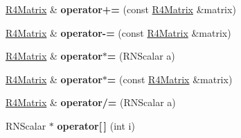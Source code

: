 \begin{DoxyCompactItemize}
\item 
\hyperlink{class_r4_matrix}{R4\+Matrix} \& {\bfseries operator+=} (const \hyperlink{class_r4_matrix}{R4\+Matrix} \&matrix)\hypertarget{class_r4_matrix_a163aa0238951f372d740945263e72efc}{}\label{class_r4_matrix_a163aa0238951f372d740945263e72efc}

\item 
\hyperlink{class_r4_matrix}{R4\+Matrix} \& {\bfseries operator-\/=} (const \hyperlink{class_r4_matrix}{R4\+Matrix} \&matrix)\hypertarget{class_r4_matrix_af39fe3d76d8e47f16345dacb07b72322}{}\label{class_r4_matrix_af39fe3d76d8e47f16345dacb07b72322}

\item 
\hyperlink{class_r4_matrix}{R4\+Matrix} \& {\bfseries operator$\ast$=} (R\+N\+Scalar a)\hypertarget{class_r4_matrix_a56fb33b63532eac31e4296d121e73f72}{}\label{class_r4_matrix_a56fb33b63532eac31e4296d121e73f72}

\item 
\hyperlink{class_r4_matrix}{R4\+Matrix} \& {\bfseries operator$\ast$=} (const \hyperlink{class_r4_matrix}{R4\+Matrix} \&matrix)\hypertarget{class_r4_matrix_a5e6dcc2ee5f0aa6e6affb9188ba034b9}{}\label{class_r4_matrix_a5e6dcc2ee5f0aa6e6affb9188ba034b9}

\item 
\hyperlink{class_r4_matrix}{R4\+Matrix} \& {\bfseries operator/=} (R\+N\+Scalar a)\hypertarget{class_r4_matrix_af8e1b424309f94073c865801e51e7a99}{}\label{class_r4_matrix_af8e1b424309f94073c865801e51e7a99}

\item 
R\+N\+Scalar $\ast$ {\bfseries operator\mbox{[}$\,$\mbox{]}} (int i)\hypertarget{class_r4_matrix_a9430a0db2210bab4e4d48d0424f28368}{}\label{class_r4_matrix_a9430a0db2210bab4e4d48d0424f28368}

\end{DoxyCompactItemize}
